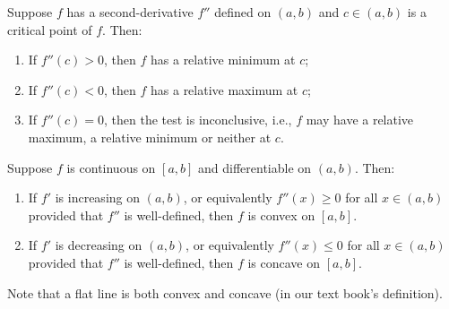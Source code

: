 	\begin{theoremenv}
		Suppose $f$ has a second-derivative $f''$ defined on $(a,b)$ and $c\in (a,b)$ is a critical point of $f$. Then:
		\begin{enumerate}
			\item [(1)] If $f''(c)>0$, then $f$ has a relative minimum at $c$;
			\item [(2)] If $f''(c)<0$, then $f$ has a relative maximum at $c$;
			\item [(3)] If $f''(c)=0$, then the test is inconclusive, i.e., $f$ may have a relative maximum, a relative minimum or neither at $c$.
		\end{enumerate}
	\end{theoremenv}
	\begin{theoremenv}
		Suppose $f$ is continuous on $[a,b]$ and differentiable on $(a,b)$. Then:
		\begin{enumerate}
			\item If $f'$ is increasing on $(a,b)$, or equivalently $f''(x) \geq 0$ for all $x \in (a,b)$ provided that $f''$ is well-defined, then $f$ is convex on $[a,b]$.
			\item If $f'$ is decreasing on $(a,b)$, or equivalently $f''(x) \leq 0$ for all $x \in (a,b)$ provided that $f''$ is well-defined, then $f$ is concave on $[a,b]$.
		\end{enumerate}
	\end{theoremenv}
	\begin{remarkenv}
		Note that a flat line is both convex and concave (in our text book's definition).
	\end{remarkenv}

	\newpage